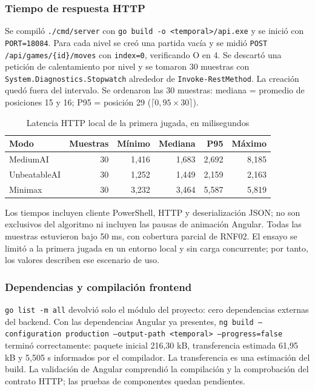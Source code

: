 \documentclass[12pt,a4paper]{article}
\begin{document}
\subsubsection{Tiempo de respuesta HTTP}
Se compiló \texttt{./cmd/server} con \texttt{go build -o <temporal>/api.exe} y se
inició con \texttt{PORT=18084}. Para cada nivel se creó una partida vacía y se
midió \texttt{POST /api/games/\{id\}/moves} con \texttt{index=0}, verificando O en 4.
Se descartó una petición de calentamiento por nivel y se tomaron 30 muestras con
\texttt{System.Diagnostics.Stopwatch} alrededor de \texttt{Invoke-RestMethod}.
La creación quedó fuera del intervalo. Se ordenaron las 30 muestras: mediana =
promedio de posiciones 15 y 16; P95 = posición 29 ($\lceil0{,}95\times30\rceil$).
\begin{table}[H]
\centering\small
\caption{Latencia HTTP local de la primera jugada, en milisegundos}
\begin{tabular}{lrrrrr}
\toprule Modo & Muestras & Mínimo & Mediana & P95 & Máximo\\\midrule
MediumAI & 30 & 1,416 & 1,683 & 2,692 & 8,185\\
UnbeatableAI & 30 & 1,252 & 1,449 & 2,159 & 2,163\\
Minimax & 30 & 3,232 & 3,464 & 5,587 & 5,819\\
\bottomrule
\end{tabular}
\end{table}
Los tiempos incluyen cliente PowerShell, HTTP y deserialización JSON; no son
exclusivos del algoritmo ni incluyen las pausas de animación Angular. Todas las
muestras estuvieron bajo 50 ms, con cobertura parcial de RNF02. El ensayo se
limitó a la primera jugada en un entorno local y sin carga concurrente; por tanto,
los valores describen ese escenario de uso.

\subsubsection{Dependencias y compilación frontend}
\texttt{go list -m all} devolvió solo el módulo del proyecto: cero dependencias
externas del backend. Con las dependencias Angular ya presentes,
\texttt{ng build --configuration production --output-path <temporal> --progress=false}
terminó correctamente: paquete inicial 216,30 kB, transferencia estimada 61,95 kB
y 5,505 s informados por el compilador. La transferencia es una estimación del
build. La validación de Angular comprendió la compilación y la comprobación del
contrato HTTP; las pruebas de componentes quedan pendientes.
\end{document}
